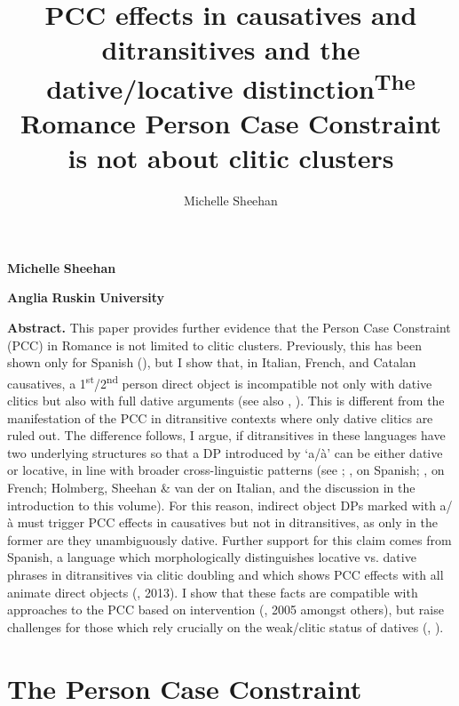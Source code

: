 \documentclass[output=paper,modfonts,nonflat]{langsci/langscibook}
\author{Michelle Sheehan	\affiliation{}}
\title{PCC effects in causatives and ditransitives and the dative/locative distinction}
\begin{document}
\maketitle 

\title{\textsuperscript{The} Romance Person Case Constraint is not about clitic clusters} 

\textbf{Michelle} \textbf{Sheehan}

\textbf{Anglia} \textbf{Ruskin} \textbf{University}

\begin{stylelsAbstract}
\textbf{Abstract.} This paper provides further evidence that the Person Case Constraint (PCC) in Romance is not limited to clitic clusters. Previously, this has been shown only for Spanish (\citealt{OrmazabalRomero2013}), but I show that, in Italian, French, and Catalan causatives, a 1\textsuperscript{st}/2\textsuperscript{nd} person direct object is incompatible not only with dative clitics but also with full dative arguments (see also \citealt{Postal1989}, \citealt{Bonet1991}). This is different from the manifestation of the PCC in ditransitive contexts where only dative clitics are ruled out. The difference follows, I argue, if ditransitives in these languages have two underlying structures so that a DP introduced by ‘a/à’ can be either dative or locative, in line with broader cross-linguistic patterns (see \citealt{Harley2002}; \citealt{Demonte1995}, \citealt{Cuervo2003} on Spanish; \citealt{Anagnostopoulou2003}, \citealt{Fournier2010} on French; Holmberg, Sheehan \& van der \citealt{Wal2018} on Italian, and the discussion in the introduction to this volume). For this reason, indirect object DPs marked with a/à must trigger PCC effects in causatives but not in ditransitives, as only in the former are they unambiguously dative. Further support for this claim comes from Spanish, a language which morphologically distinguishes locative vs. dative phrases in ditransitives via clitic doubling \citep{Cuervo2003} and which shows PCC effects with all animate direct objects (\citealt{OrmazabalRomero2007}, 2013). I show that these facts are compatible with approaches to the PCC based on intervention (\citealt{Anagnostopoulou2003}, 2005 amongst others), but raise challenges for those which rely crucially on the weak/clitic status of datives (\citealt{Bianchi2006}, \citealt{Stegovec2017}). 
\end{stylelsAbstract}

\section{The Person Case Constraint} %
\end{document}
